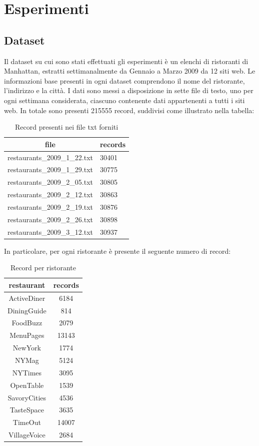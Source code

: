 \documentclass[a4paper,12pt]{article}
\begin{document}
\section{Esperimenti}
\subsection{Dataset}
Il dataset su cui sono stati effettuati gli esperimenti è un elenchi di ristoranti di Manhattan, estratti settimanalmente da Gennaio a Marzo 2009 da 12 siti web. Le informazioni base presenti in ogni dataset comprendono il nome del ristorante, l'indirizzo e la città.
I dati sono messi a disposizione in sette file di testo, uno per ogni settimana considerata, ciascuno contenente dati appartenenti a tutti i siti web. In totale sono presenti 215555 record, suddivisi come illustrato nella tabella:
\begin{table}[H] \centering
\begin{tabular}{|l|l|}
\hline
\multicolumn{1}{|c|}{\textbf{file}} & \multicolumn{1}{c|}{\textbf{records}} \\ \hline
restaurants\_2009\_1\_22.txt & 30401 \\ \hline
restaurants\_2009\_1\_29.txt & 30775 \\ \hline
restaurants\_2009\_2\_05.txt & 30805 \\ \hline
restaurants\_2009\_2\_12.txt & 30863 \\ \hline
restaurants\_2009\_2\_19.txt & 30876 \\ \hline
restaurants\_2009\_2\_26.txt & 30898 \\ \hline
restaurants\_2009\_3\_12.txt & 30937 \\ \hline
\end{tabular}
\caption{Record presenti nei file txt forniti}
\label{tab:Tab}
\end{table}

In particolare, per ogni ristorante è presente il seguente numero di record:

\begin{table}[H]\centering
\begin{tabular}{|c|c|}
\hline
\textbf{restaurant} & \textbf{records} \\ \hline
ActiveDiner & 6184 \\ \hline
DiningGuide & 814 \\ \hline
FoodBuzz & 2079 \\ \hline
MenuPages & 13143 \\ \hline
NewYork & 1774 \\ \hline
NYMag & 5124 \\ \hline
NYTimes & 3095 \\ \hline
OpenTable & 1539 \\ \hline
SavoryCities & 4536 \\ \hline
TasteSpace & 3635 \\ \hline
TimeOut & 14007 \\ \hline
VillageVoice & 2684 \\ \hline
\end{tabular}
\caption{Record per ristorante}
\label{tab:my-table}
\end{table}
\end{document}

